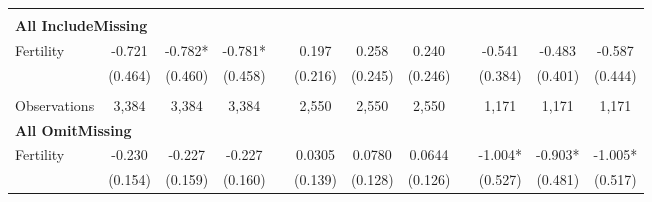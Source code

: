 \begin{landscape}
\begin{table}[htpb!]
\begin{center}
\begin{tabular}{lcccp{2mm}cccp{2mm}ccc}
\begin{footnotesize}\end{footnotesize}\\ 
\multicolumn{12}{l}{\textbf{All IncludeMissing}}\\ 
Fertility&-0.721&-0.782*&-0.781*&&0.197&0.258&0.240&&-0.541&-0.483&-0.587\\
&(0.464)&(0.460)&(0.458)&&(0.216)&(0.245)&(0.246)&&(0.384)&(0.401)&(0.444)\\
\begin{footnotesize}\end{footnotesize}&\begin{footnotesize}\end{footnotesize}&\begin{footnotesize}\end{footnotesize}&\begin{footnotesize}\end{footnotesize}&\begin{footnotesize}\end{footnotesize}&\begin{footnotesize}\end{footnotesize}&\begin{footnotesize}\end{footnotesize}&\begin{footnotesize}\end{footnotesize}&\begin{footnotesize}\end{footnotesize}&\begin{footnotesize}\end{footnotesize}&\begin{footnotesize}\end{footnotesize}&\begin{footnotesize}\end{footnotesize}\\Observations&3,384&3,384&3,384&&2,550&2,550&2,550&&1,171&1,171&1,171\\
\multicolumn{12}{l}{\textbf{All OmitMissing}}\\ 
Fertility&-0.230&-0.227&-0.227&&0.0305&0.0780&0.0644&&-1.004*&-0.903*&-1.005*\\
&(0.154)&(0.159)&(0.160)&&(0.139)&(0.128)&(0.126)&&(0.527)&(0.481)&(0.517)\\

\end{tabular}
\end{center}
\end{table}
\end{landscape}
